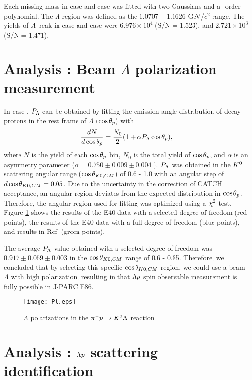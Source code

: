 \documentclass[a4paper,11pt,twoside,twocolumn]{article}
\begin{document}
Each missing mass in case  and case  was fitted with two Gaussians and a -order polynomial. The $\Lambda$ region was defined as the $1.0707 - 1.1626$ GeV/$c^{2}$ range. The yields of $\Lambda$ peak in case  and case  were $6.976\times10^{4}$ (S/N = 1.523), and $2.721\times10^{3}$ (S/N = 1.471).

\section{Analysis : Beam $\Lambda$ polarization measurement}
\label{sec-Pl}

In case , $P_{\Lambda}$ can be obtained by fitting the emission angle distribution of decay protons in the rest frame of $\Lambda$ ($\cos{\theta_p}$) with
\begin{equation}
  \frac{dN}{d\cos{\theta_p}} = \frac{N_0}{2}(1+\alpha P_{\Lambda}\cos{\theta_p}), 
  \label{eq-costp}
\end{equation}
where $N$ is the yield of each $\cos{\theta_p}$ bin, $N_0$ is the total yield of $\cos{\theta_p}$, and $\alpha$ is an asymmetry parameter ($\alpha=0.750\pm0.009\pm0.004$ \cite{Alpha}). $P_{\Lambda}$ was obtained in the $K^{0}$ scattering angular range ($\cos{\theta_{K0,CM}}$) of 0.6 - 1.0 with an angular step of $d\cos{\theta_{K0,CM}} = 0.05$. Due to the uncertainty in the correction of CATCH acceptance, an angular region deviates from the expected distribution in $\cos{\theta_p}$. Therefore, the angular region used for fitting was optimized using a $\chi^{2}$ test. Figure \ref{fig-Pl} shows the results of the E40 data with a selected degree of freedom (red points), the results of the E40 data with a full degree of freedom (blue points), and results in Ref. \cite{Baker} (green points). 

The average $P_{\Lambda}$ value obtained with a selected degree of freedom was $0.917\pm0.059\pm0.003$ in the $\cos{\theta_{K0,CM}}$ range of 0.6 - 0.85. Therefore, we concluded that by selecting this specific $\cos{\theta_{K0,CM}}$ region, we could use a beam $\Lambda$ with high polarization, resulting in that $\Lambda p$ spin observable measurement is fully possible in J-PARC E86.

\begin{figure}[h]
  \centering
  \texttt{[image: Pl.eps]}
  \caption{$\Lambda$ polarizations in the $\pi^- p \to K^0 \Lambda$ reaction.}
  \label{fig-Pl}
\end{figure}


\section{Analysis : $\Lambda p$ scattering identification}
\label{sec-Lp_2p}
\end{document}
